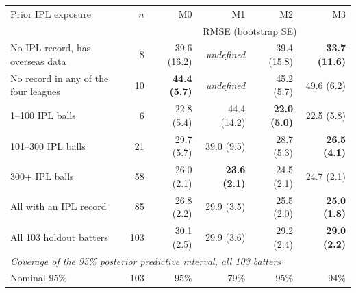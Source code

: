\begin{tabular}{lrrrrr}
\toprule
Prior IPL exposure & $n$ & M0 & M1 & M2 & M3 \\
& & \multicolumn{4}{c}{RMSE (bootstrap SE)} \\
\midrule
No IPL record, has overseas data & 8 & 39.6 (16.2) & \emph{undefined} & 39.4 (15.8) & \textbf{33.7 (11.6)} \\
No record in any of the four leagues & 10 & \textbf{44.4 (5.7)} & \emph{undefined} & 45.2 (5.7) & 49.6 (6.2) \\
1--100 IPL balls & 6 & 22.8 (5.4) & 44.4 (14.2) & \textbf{22.0 (5.0)} & 22.5 (5.8) \\
101--300 IPL balls & 21 & 29.7 (5.7) & 39.0 (9.5) & 28.7 (5.3) & \textbf{26.5 (4.1)} \\
300+ IPL balls & 58 & 26.0 (2.1) & \textbf{23.6 (2.1)} & 24.5 (2.1) & 24.7 (2.1) \\
All with an IPL record & 85 & 26.8 (2.2) & 29.9 (3.5) & 25.5 (2.0) & \textbf{25.0 (1.8)} \\
All 103 holdout batters & 103 & 30.1 (2.5) & 29.9 (3.6) & 29.2 (2.4) & \textbf{29.0 (2.2)} \\
\midrule
\multicolumn{6}{l}{\emph{Coverage of the 95\% posterior predictive interval, all 103 batters}} \\
Nominal 95\% & 103 & 95\% & 79\% & 95\% & 94\% \\
\bottomrule
\end{tabular}